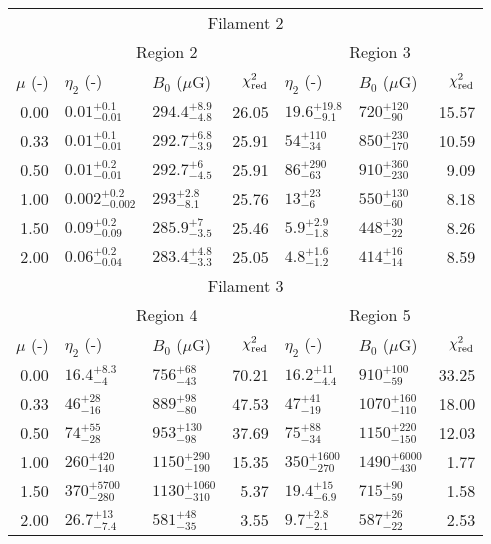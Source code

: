 \begin{tabular}{@{}rllr llr@{}}

\toprule
\multicolumn{7}{c}{Filament 2} \\
\cmidrule{1-7}
{} & \multicolumn{3}{c}{Region 2\tablenotemark{a}}
   & \multicolumn{3}{c}{Region 3} \\
\cmidrule(lr){2-4} \cmidrule(l){5-7}
$\mu$ (-) & $\eta_2$ (-) & $B_0$ ($\mu$G) & $\chi^2_{\mathrm{red}}$
          & $\eta_2$ (-) & $B_0$ ($\mu$G) & $\chi^2_{\mathrm{red}}$ \\
\cmidrule{1-7}
0.00 & ${0.01}^{+0.1}_{-0.01}$ & ${294.4}^{+8.9}_{-4.8}$ & 26.05
     & ${19.6}^{+19.8}_{-9.1}$ & ${720}^{+120}_{-90}$    & 15.57 \\
0.33 & ${0.01}^{+0.1}_{-0.01}$ & ${292.7}^{+6.8}_{-3.9}$ & 25.91
     & ${54}^{+110}_{-34}$ & ${850}^{+230}_{-170}$       & 10.59 \\
0.50 & ${0.01}^{+0.2}_{-0.01}$ & ${292.7}^{+6}_{-4.5}$   & 25.91
     & ${86}^{+290}_{-63}$ & ${910}^{+360}_{-230}$       & 9.09 \\
1.00 & ${0.002}^{+0.2}_{-0.002}$ & ${293}^{+2.8}_{-8.1}$ & 25.76
     & ${13}^{+23}_{-6}$ & ${550}^{+130}_{-60}$          & 8.18 \\
1.50 & ${0.09}^{+0.2}_{-0.09}$ & ${285.9}^{+7}_{-3.5}$   & 25.46
     & ${5.9}^{+2.9}_{-1.8}$ & ${448}^{+30}_{-22}$       & 8.26 \\
2.00 & ${0.06}^{+0.2}_{-0.04}$ & ${283.4}^{+4.8}_{-3.3}$ & 25.05
     & ${4.8}^{+1.6}_{-1.2}$ & ${414}^{+16}_{-14}$       & 8.59 \\

\midrule
\multicolumn{7}{c}{Filament 3} \\
\cmidrule{1-7}
{} & \multicolumn{3}{c}{Region 4}
   & \multicolumn{3}{c}{Region 5} \\
\cmidrule(lr){2-4} \cmidrule(l){5-7}
$\mu$ (-) & $\eta_2$ (-) & $B_0$ ($\mu$G) & $\chi^2_{\mathrm{red}}$
          & $\eta_2$ (-) & $B_0$ ($\mu$G) & $\chi^2_{\mathrm{red}}$ \\
\cmidrule{1-7}

0.00 & ${16.4}^{+8.3}_{-4}$ & ${756}^{+68}_{-43}$       & 70.21
     & ${16.2}^{+11}_{-4.4}$ & ${910}^{+100}_{-59}$     & 33.25 \\
0.33 & ${46}^{+28}_{-16}$ & ${889}^{+98}_{-80}$         & 47.53
     & ${47}^{+41}_{-19}$ & ${1070}^{+160}_{-110}$      & 18.00 \\
0.50 & ${74}^{+55}_{-28}$ & ${953}^{+130}_{-98}$        & 37.69
     & ${75}^{+88}_{-34}$ & ${1150}^{+220}_{-150}$      & 12.03 \\
1.00 & ${260}^{+420}_{-140}$ & ${1150}^{+290}_{-190}$   & 15.35
     & ${350}^{+1600}_{-270}$ & ${1490}^{+6000}_{-430}$ & 1.77 \\
1.50 & ${370}^{+5700}_{-280}$ & ${1130}^{+1060}_{-310}$ & 5.37
     & ${19.4}^{+15}_{-6.9}$ & ${715}^{+90}_{-59}$      & 1.58 \\
2.00 & ${26.7}^{+13}_{-7.4}$ & ${581}^{+48}_{-35}$      & 3.55
     & ${9.7}^{+2.8}_{-2.1}$ & ${587}^{+26}_{-22}$      & 2.53 \\


\end{tabular}
